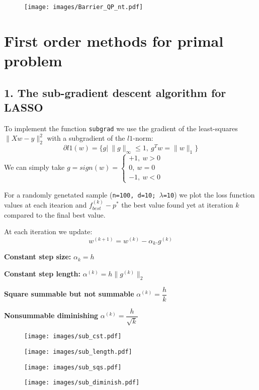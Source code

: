 \documentclass[11pt]{article}
\theoremstyle{exo}
\newcommand{\1}{\mathbf{1}}
\newcommand{\0}{\mathbf{0}}
\begin{document}
\begin{figure}[H]
\centering
\texttt{[image: images/Barrier\_QP\_nt.pdf]}
\end{figure}

\section{First order methods for primal problem}
\subsection*{1. The sub-gradient descent algorithm for LASSO}
To implement the function \texttt{subgrad} we use the gradient of the least-squares $\|Xw-y\|_2^2$ with a subgradient of the $l1$-norm:
\[\partial l1(w)=\{g|\:\|g\|_\infty\leq 1,\:g^Tw=\|w\|_1\}\]
We can simply take $g=sign(w)=\begin{cases}+1,\:w>0\\0,\:w=0\\-1,\:w<0\end{cases}$

For a randomly genetated sample (\texttt{n=100, d=10; $\lambda$=10}) we plot the loss function values at each itearion and $f_{best}^{(k)}-p^*$ the best value found yet at iteration $k$ compared to the final best value.

At each iteration we update:
\[w^{(k+1)}=w^{(k)}-\alpha_k.g^{(k)}\] 

\textbf{Constant step size:} $\alpha_k=h$

\textbf{Constant step length:} $\alpha^{(k)}=h\|g^{(k)}\|_2$

\textbf{Square summable but not summable} $\alpha^{(k)}=\dfrac{h}{k}$

\textbf{Nonsummable diminishing} $\alpha^{(k)}=\dfrac{h}{\sqrt k}$
\begin{figure}[H]
\centering
\texttt{[image: images/sub\_cst.pdf]}
\end{figure}

\begin{figure}[H]
\centering
\texttt{[image: images/sub\_length.pdf]}
\end{figure}

\begin{figure}[H]
\centering
\texttt{[image: images/sub\_sqs.pdf]}

\end{figure}
\begin{figure}[H]
\centering
\texttt{[image: images/sub\_diminish.pdf]}
\end{figure}
\end{document}
